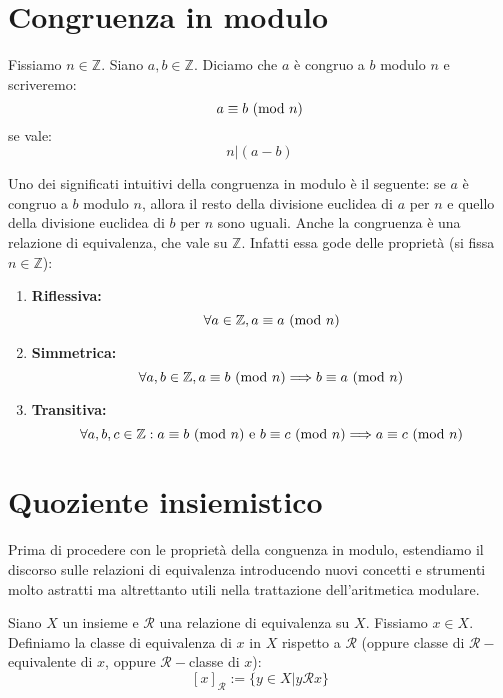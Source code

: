 
\section{Congruenza in modulo}
\begin{tcolorbox}[colback=yellow!30, colframe=yellow!30!black, title=Congruenza in Modulo $n$]
Fissiamo $n \in \mathbb{Z}$. Siano $a,b \in \mathbb{Z}$. Diciamo
che $a$ è congruo a $b$ modulo $n$ e scriveremo: \[ a \equiv b \ (\mathrm{mod}\ n) \]
se vale: \[n|(a-b)\]
\end{tcolorbox}

Uno dei significati intuitivi della congruenza in modulo è il seguente:
se $a$ è congruo a $b$ modulo $n$, allora il resto della divisione euclidea
di $a$ per $n$ e quello della divisione euclidea di $b$ per $n$ sono uguali.
Anche la congruenza è una relazione di equivalenza, che vale su $\mathbb{Z}$.
Infatti essa gode delle proprietà (si fissa $n\in\mathbb{Z}$):
\begin{enumerate}
\item \textbf{Riflessiva:} \[ \forall a \in \mathbb{Z}, a \equiv a \ (\mathrm{mod}\ n) \]
\item \textbf{Simmetrica:} \[ \forall a,b \in \mathbb{Z}, a \equiv b \ (\mathrm{mod}\ n) \Longrightarrow b \equiv a \ (\mathrm{mod}\ n) \]
\item \textbf{Transitiva:} \[\forall a,b,c \in \mathbb{Z}: a \equiv b \ (\mathrm{mod}\ n) \text{ e } b \equiv c \ (\mathrm{mod}\ n) \Longrightarrow a \equiv c \ (\mathrm{mod}\ n) \]
\end{enumerate}

\section{Quoziente insiemistico}
Prima di procedere con le proprietà della conguenza in modulo, estendiamo
il discorso sulle relazioni di equivalenza introducendo nuovi concetti e
strumenti molto astratti ma altrettanto utili nella trattazione dell'aritmetica
modulare.
\vspace*{10pt}
\begin{tcolorbox}[colback=yellow!30, colframe=yellow!30!black, title=Classe di Equivalenza]
Siano $X$ un insieme e $\mathcal{R}$ una relazione di equivalenza
su $X$. Fissiamo $x \in X$. Definiamo la classe di equivalenza di $x$ in
$X$ rispetto a $\mathcal{R}$ (oppure classe di $\mathcal{R}-$equivalente
di $x$, oppure $\mathcal{R}-$classe di $x$):
\[ [x]_\mathcal{R} := \{y \in X| y \mathcal{R} x\} \]
\end{tcolorbox}

